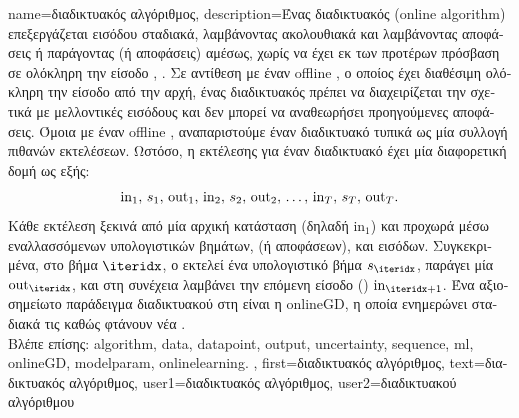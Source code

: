 {name={\foreignlanguage{greek}{διαδικτυακός αλγόριθμος}},
	description={\foreignlanguage{greek}{Ένας διαδικτυακός}  
		(online algorithm) \foreignlanguage{greek}{επεξεργάζεται}  \foreignlanguage{greek}{εισόδου σταδιακά, 
		λαμβάνοντας}  \foreignlanguage{greek}{ακολουθιακά και λαμβάνοντας αποφάσεις ή παράγοντας}  
		(\foreignlanguage{greek}{ή αποφάσεις) αμέσως, χωρίς να έχει εκ των προτέρων πρόσβαση σε ολόκληρη την είσοδο}
		\cite{PredictionLearningGames}, \cite{HazanOCO}. 
		\foreignlanguage{greek}{Σε αντίθεση με έναν} offline , \foreignlanguage{greek}{ο οποίος έχει διαθέσιμη ολόκληρη
		την είσοδο από την αρχή, ένας διαδικτυακός}  \foreignlanguage{greek}{πρέπει να διαχειρίζεται την}
		 \foreignlanguage{greek}{σχετικά με μελλοντικές εισόδους και δεν μπορεί να αναθεωρήσει προηγούμενες αποφάσεις. 
		Όμοια με έναν} offline , \foreignlanguage{greek}{αναπαριστούμε έναν διαδικτυακό}  
		\foreignlanguage{greek}{τυπικά ως μία συλλογή πιθανών εκτελέσεων. Ωστόσο, η}  \foreignlanguage{greek}{εκτέλεσης 
		για έναν διαδικτυακό}  \foreignlanguage{greek}{έχει μία διαφορετική δομή ως εξής}:
		$${\rm in}_{1}, \,s_1, \,{\rm out}_{1}, \,{\rm in}_{2}, \,s_2, \,{\rm out}_{2}, \,\ldots, \,{\rm in}_{T}, \,s_T, \,{\rm out}_{T}.$$ 
		\foreignlanguage{greek}{Κάθε εκτέλεση ξεκινά από μία αρχική κατάσταση (δηλαδή} \(\text{in}_{1}\)) \foreignlanguage{greek}{και προχωρά μέσω 
		εναλλασσόμενων υπολογιστικών βημάτων},  (\foreignlanguage{greek}{ή αποφάσεων), και εισόδων. Συγκεκριμένα, 
		στο βήμα \(\iteridx\), ο}  \foreignlanguage{greek}{εκτελεί ένα υπολογιστικό βήμα \(s_{\iteridx}\), παράγει μία} 
		 \(\text{out}_{\iteridx}\), \foreignlanguage{greek}{και στη συνέχεια λαμβάνει την επόμενη είσοδο} 
		() \(\text{in}_{\iteridx+1}\). \foreignlanguage{greek}{Ένα αξιοσημείωτο παράδειγμα διαδικτυακού}  
		\foreignlanguage{greek}{στη}  \foreignlanguage{greek}{είναι η} \gls{onlineGD}, \foreignlanguage{greek}{η οποία 
		ενημερώνει σταδιακά τις}  \foreignlanguage{greek}{καθώς φτάνουν νέα} . 
					\\ 
		\foreignlanguage{greek}{Βλέπε επίσης:} \gls{algorithm}, \gls{data}, \gls{datapoint}, \gls{output}, \gls{uncertainty}, \gls{sequence}, \gls{ml}, \gls{onlineGD}, 
		\gls{modelparam}, \gls{onlinelearning}. },
	first={\foreignlanguage{greek}{διαδικτυακός αλγόριθμος}},
	text={\foreignlanguage{greek}{διαδικτυακός αλγόριθμος}},
	user1={\foreignlanguage{greek}{διαδικτυακός αλγόριθμος}}, %
  	user2={\foreignlanguage{greek}{διαδικτυακού αλγόριθμου}} %
}

